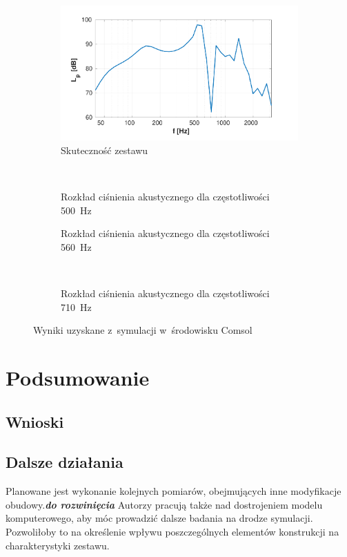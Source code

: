 \documentclass[12pt]{oska}
\newcommand{\comment}[1]{{\color{magenta}\emph{\textbf{#1}}}}
\begin{document}
		\begin{figure}[!ht]
		\centering
			\begin{subfigure}[b]{.48\textwidth}
			\includegraphics[width=\textwidth,trim={1.25cm .5cm 2cm 1cm},clip]{skutecznosc_comsol.pdf}
				\caption{Skuteczność zestawu}
				\label{r:C_skutecznosc}
			\end{subfigure}
			~
			\begin{subfigure}[b]{.48\textwidth}
				\caption{Rozkład ciśnienia akustycznego dla częstotliwości \SI{500}{\hertz}}
				\label{r:C_500}
			\end{subfigure}
			
			\begin{subfigure}[b]{.48\textwidth}
				\caption{Rozkład ciśnienia akustycznego dla częstotliwości \SI{560}{\hertz}}
				\label{r:C_560}
			\end{subfigure}
			~
			\begin{subfigure}[b]{.48\textwidth}
				\caption{Rozkład ciśnienia akustycznego dla częstotliwości \SI{710}{\hertz}}
				\label{r:C_710}
			\end{subfigure}
			\caption{Wyniki uzyskane z~symulacji w~środowisku Comsol}
			\label{r:Comsol}
		\end{figure}
		
		

\section{Podsumowanie}
	
	\subsection{Wnioski}
	
	\subsection{Dalsze działania}
	
		Planowane jest wykonanie kolejnych pomiarów, obejmujących inne modyfikacje obudowy.\comment{do rozwinięcia} Autorzy pracują także nad dostrojeniem modelu komputerowego, aby móc prowadzić dalsze badania na drodze symulacji. Pozwoliłoby to na określenie wpływu poszczególnych elementów konstrukcji na charakterystyki zestawu.
		
\printbibliography
\end{document}
